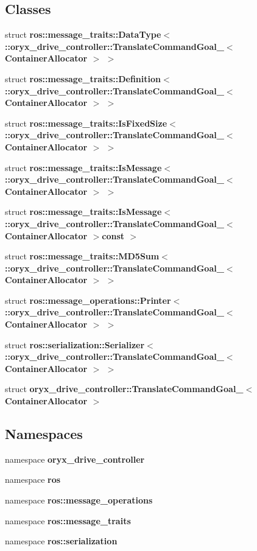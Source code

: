 \subsection*{\-Classes}
\begin{DoxyCompactItemize}
\item 
struct {\bf ros\-::message\-\_\-traits\-::\-Data\-Type$<$ \-::oryx\-\_\-drive\-\_\-controller\-::\-Translate\-Command\-Goal\-\_\-$<$ Container\-Allocator $>$ $>$}
\item 
struct {\bf ros\-::message\-\_\-traits\-::\-Definition$<$ \-::oryx\-\_\-drive\-\_\-controller\-::\-Translate\-Command\-Goal\-\_\-$<$ Container\-Allocator $>$ $>$}
\item 
struct {\bf ros\-::message\-\_\-traits\-::\-Is\-Fixed\-Size$<$ \-::oryx\-\_\-drive\-\_\-controller\-::\-Translate\-Command\-Goal\-\_\-$<$ Container\-Allocator $>$ $>$}
\item 
struct {\bf ros\-::message\-\_\-traits\-::\-Is\-Message$<$ \-::oryx\-\_\-drive\-\_\-controller\-::\-Translate\-Command\-Goal\-\_\-$<$ Container\-Allocator $>$ $>$}
\item 
struct {\bf ros\-::message\-\_\-traits\-::\-Is\-Message$<$ \-::oryx\-\_\-drive\-\_\-controller\-::\-Translate\-Command\-Goal\-\_\-$<$ Container\-Allocator $>$const  $>$}
\item 
struct {\bf ros\-::message\-\_\-traits\-::\-M\-D5\-Sum$<$ \-::oryx\-\_\-drive\-\_\-controller\-::\-Translate\-Command\-Goal\-\_\-$<$ Container\-Allocator $>$ $>$}
\item 
struct {\bf ros\-::message\-\_\-operations\-::\-Printer$<$ \-::oryx\-\_\-drive\-\_\-controller\-::\-Translate\-Command\-Goal\-\_\-$<$ Container\-Allocator $>$ $>$}
\item 
struct {\bf ros\-::serialization\-::\-Serializer$<$ \-::oryx\-\_\-drive\-\_\-controller\-::\-Translate\-Command\-Goal\-\_\-$<$ Container\-Allocator $>$ $>$}
\item 
struct {\bf oryx\-\_\-drive\-\_\-controller\-::\-Translate\-Command\-Goal\-\_\-$<$ Container\-Allocator $>$}
\end{DoxyCompactItemize}
\subsection*{\-Namespaces}
\begin{DoxyCompactItemize}
\item 
namespace {\bf oryx\-\_\-drive\-\_\-controller}
\item 
namespace {\bf ros}
\item 
namespace {\bf ros\-::message\-\_\-operations}
\item 
namespace {\bf ros\-::message\-\_\-traits}
\item 
namespace {\bf ros\-::serialization}
\end{DoxyCompactItemize}
